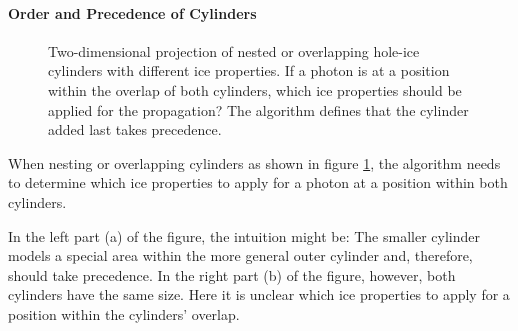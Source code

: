 \paragraph{Order and Precedence of Cylinders}

\begin{figure}[htbp]
  \hfill
  \caption{Two-dimensional projection of nested or overlapping hole-ice cylinders with different ice properties. If a photon is at a position within the overlap of both cylinders, which ice properties should be applied for the propagation? The algorithm defines that the cylinder added last takes precedence.}
  \label{fig:kuZ8deek}
\end{figure}

When nesting or overlapping cylinders as shown in figure \ref{fig:kuZ8deek}, the algorithm needs to determine which ice properties to apply for a photon at a position within both cylinders.

In the left part (a) of the figure, the intuition might be: The smaller cylinder models a special area within the more general outer cylinder and, therefore, should take precedence. In the right part (b) of the figure, however, both cylinders have the same size. Here it is unclear which ice properties to apply for a position within the cylinders' overlap.


